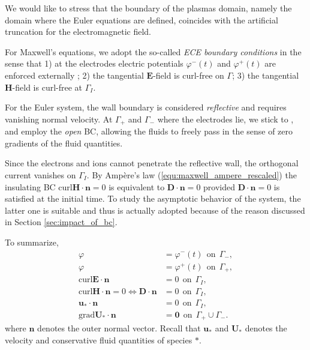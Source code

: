 \documentclass{report}
\begin{document}
We would like to stress that the boundary of the plasmas domain, namely the domain where the Euler equations are defined, coincides with the artificial truncation for the electromagnetic field.

For Maxwell's equations, we adopt the so-called \emph{ECE boundary conditions} in the sense that 1) at the electrodes electric potentials $\varphi^-(t)$ and $\varphi^+(t)$ are enforced externally
; 2) the tangential $\mathbf{E}$-field is curl-free on $\Gamma$; 3) the tangential $\mathbf{H}$-field is curl-free at $\Gamma_I$. 

For the Euler system, the wall boundary is considered \emph{reflective} and requires vanishing normal velocity. At $\Gamma_+$ and $\Gamma_-$ where the electrodes lie, we stick to \cite{fuchs_2021}, and employ the \emph{open} BC, allowing the fluids to freely pass in the sense of zero gradients of the fluid quantities. 

Since the electrons and ions cannot penetrate the reflective wall, the orthogonal current vanishes on $\Gamma_I$. By Amp\`{e}re's law (\ref{equ:maxwell_ampere_rescaled}) the insulating BC $\text{curl}\mathbf{H} \cdot \mathbf{n} = 0$ is equivalent to $\mathbf{D}\cdot\mathbf{n} = 0$ provided $\mathbf{D}\cdot\mathbf{n} = 0$ is satisfied at the initial time. To study the asymptotic behavior of the system, the latter one is suitable and thus is actually adopted because of the reason discussed in Section \ref{sec:impact_of_bc}.  

To summarize, 
\begin{align}
    \varphi &= \varphi^-(t)\ \ \text{on} \ \ \Gamma_-, \label{equ:bc_1}\\
    \varphi &= \varphi^+(t)\ \ \text{on} \ \ \Gamma_+, \label{equ:bc_2}\\
    \text{curl} \mathbf{E} \cdot \mathbf{n} &= 0\ \ \text{on} \ \  \Gamma_I,  \label{equ:bc_3}\\
    \text{curl} \mathbf{H} \cdot \mathbf{n} = 0 \Leftrightarrow \mathbf{D} \cdot \mathbf{n} &= 0\ \  \text{on} \ \  \Gamma_I, \label{equ:bc_4}\\
    \mathbf{u_*}\cdot \mathbf{n} &= 0 \ \ \text{on} \ \ \Gamma_I, \label{equ:bc_5}\\
    \text{grad}\mathbf{U_*} \cdot \mathbf{n} &= \mathbf{0} \ \ \text{on} \ \ \Gamma_+\cup\Gamma_-. \label{equ:bc_6}
\end{align}
where $\mathbf{n}$ denotes the outer normal vector. Recall that $\mathbf{u}_*$ and $\mathbf{U}_*$ denotes the velocity and conservative fluid quantities of species $*$. 
\end{document}
